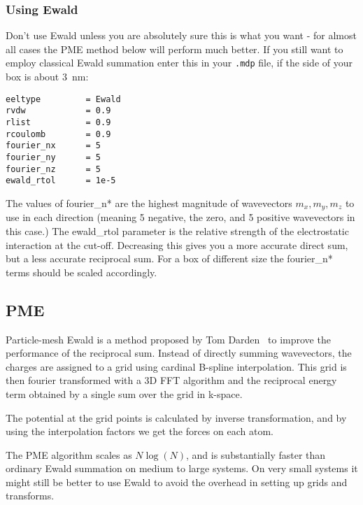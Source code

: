\subsubsection{Using Ewald}
Don't use Ewald unless you are absolutely sure this is what you want - 
for almost all cases the PME method below will perform much better. 
If you still want to employ classical Ewald summation enter this in
your {\tt .mdp} file, if the side of your box is about $3$~nm:
\begin{verbatim}
eeltype         = Ewald
rvdw            = 0.9
rlist           = 0.9
rcoulomb        = 0.9
fourier_nx      = 5
fourier_ny      = 5
fourier_nz      = 5
ewald_rtol      = 1e-5
\end{verbatim}
The values of fourier\_n* are the highest magnitude of wavevectors
$m_x,m_y,m_z$ to use in each direction (meaning 5 negative, the zero,
and 5 positive wavevectors in this case.)
The ewald\_rtol parameter is the relative
strength of the electrostatic interaction at the cut-off. Decreasing
this gives you a more accurate direct sum, but a less accurate
reciprocal sum. For a box of different size the fourier\_n* terms
should be scaled accordingly.
 
\subsection{PME}
\label{sec:pme}
Particle-mesh Ewald is a method proposed by Tom
Darden~\cite{Darden93,Essmann95} to improve the performance of the
reciprocal sum. Instead of directly summing wavevectors, the charges
are assigned to a grid using cardinal B-spline interpolation. This
grid is then fourier transformed with a 3D FFT algorithm and 
the reciprocal energy term obtained by a single sum over the grid in k-space.

The potential at the grid points is calculated by inverse
transformation, and by using the interpolation factors we get the
forces on each atom. 

The PME algorithm scales as $N \log(N)$, and is substantially faster
than ordinary Ewald summation on medium to large systems. On very
small systems it might still be better to use Ewald to avoid the
overhead in setting up grids and transforms.

